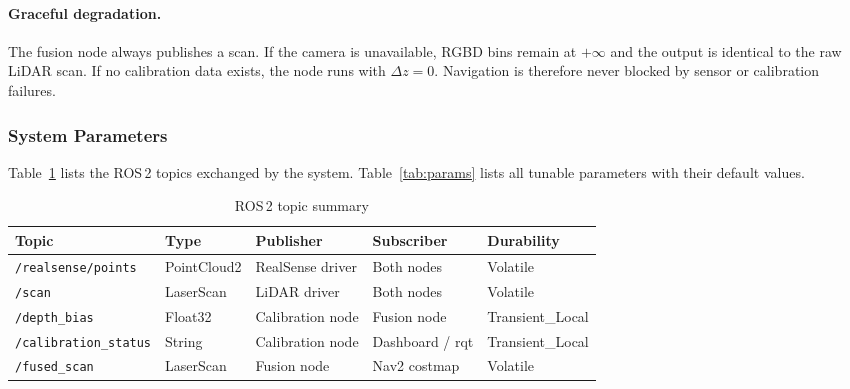 \paragraph{Graceful degradation.}
The fusion node always publishes a scan. If the camera is unavailable,
RGBD bins remain at $+\infty$ and the output is identical to the raw
LiDAR scan. If no calibration data exists, the node runs with
$\Delta z = 0$. Navigation is therefore never blocked by sensor or
calibration failures.

\subsubsection{System Parameters}

Table~\ref{tab:topics} lists the ROS\,2 topics exchanged by the
system. Table~\ref{tab:params} lists all tunable parameters with
their default values.

\begin{table}[H]
\centering
\caption{ROS\,2 topic summary}
\label{tab:topics}
\begin{tabular}{lllll}
\hline
\textbf{Topic} & \textbf{Type} & \textbf{Publisher}
               & \textbf{Subscriber} & \textbf{Durability} \\
\hline
\texttt{/realsense/points}
    & PointCloud2   & RealSense driver  & Both nodes       & Volatile \\
\texttt{/scan}
    & LaserScan     & LiDAR driver      & Both nodes       & Volatile \\
\texttt{/depth\_bias}
    & Float32       & Calibration node  & Fusion node      & Transient\_Local \\
\texttt{/calibration\_status}
    & String        & Calibration node  & Dashboard / rqt  & Transient\_Local \\
\texttt{/fused\_scan}
    & LaserScan     & Fusion node       & Nav2 costmap     & Volatile \\
\hline
\end{tabular}
\end{table}

